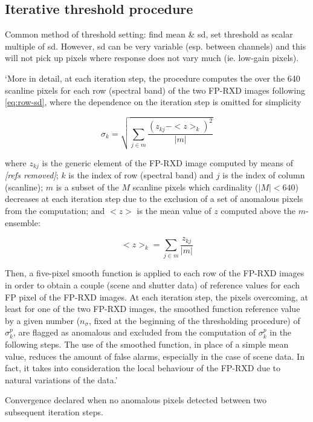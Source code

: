 \documentclass[10pt,fleqn]{article}
\begin{document}
\begin{itemize}
\subsection{Iterative threshold procedure}
Common method of threshold setting: find mean \& sd, set threshold as scalar multiple of sd. However, sd can be very variable (esp. between channels) and this will not pick up pixels where response does not vary much (ie. low-gain pixels).

`More in detail, at each iteration step, the procedure computes the over the 640 scanline pixels for each row (spectral band) of the two FP-RXD images following \ref{eq:row-sd}, where the dependence on the iteration step is omitted for simplicity 

\begin{equation}
\label{eq:row-sd}
\sigma_k = \sqrt{\sum_{j \in m} \frac{(z_{kj} - <z>_k)^2}{\left|m \right|}}
\end{equation}

where $z_{kj}$ is the generic element of the FP-RXD image computed by means of \textit{[refs removed]}; $k$ is the index of row (spectral band) and $j$ is the index of column (scanline); $m$ is a subset of the $M$ scanline pixels which cardinality ($|M| < 640$) decreases at each iteration step due to the exclusion of a set of anomalous pixels from the computation; and $<z>$ is the mean value of $z$ computed above the $m$- ensemble:

\begin{equation}
\label{eq:adj-mean}
<z>_k = \sum_{j\in m} \frac{z_{kj}}{|m|}
\end{equation}

Then, a five-pixel smooth function is applied to each row of the FP-RXD images in order to obtain a couple (scene and shutter data) of reference values for each FP pixel of the FP-RXD images. At each iteration step, the pixels overcoming, at least for one of the two FP-RXD images, the smoothed function reference value by a given number ($n_\sigma$, fixed at the beginning of the thresholding procedure) of $\sigma_k^p$, are flagged as anomalous and excluded from the computation of $\sigma_k^p$ in the following steps. The use of the smoothed function, in place of a simple mean value, reduces the amount of false alarms, especially in the case of scene data. In fact, it takes into consideration the local behaviour of the  FP-RXD due to natural variations of the data.'

Convergence declared when no anomalous pixels detected between two subsequent iteration steps.


\end{itemize}
\end{document}
